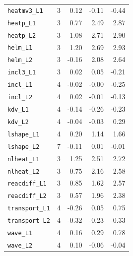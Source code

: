\begin{longtable}{lrrrr}
\texttt{heatmv3\_L1} & 3 & 0.12 & -0.11 & -0.44 \\
\texttt{heatp\_L1} & 3 & 0.77 & 2.49 & 2.87 \\
\texttt{heatp\_L2} & 3 & 1.08 & 2.71 & 2.90 \\
\texttt{helm\_L1} & 3 & 1.20 & 2.69 & 2.93 \\
\texttt{helm\_L2} & 3 & -0.16 & 2.08 & 2.64 \\
\texttt{incl3\_L1} & 3 & 0.02 & 0.05 & -0.21 \\
\texttt{incl\_L1} & 4 & -0.02 & -0.00 & -0.25 \\
\texttt{incl\_L2} & 4 & 0.02 & -0.01 & -0.13 \\
\texttt{kdv\_L1} & 4 & -0.14 & -0.26 & -0.23 \\
\texttt{kdv\_L2} & 4 & -0.04 & -0.03 & 0.29 \\
\texttt{lshape\_L1} & 4 & 0.20 & 1.14 & 1.66 \\
\texttt{lshape\_L2} & 7 & -0.11 & 0.01 & -0.01 \\
\texttt{nlheat\_L1} & 3 & 1.25 & 2.51 & 2.72 \\
\texttt{nlheat\_L2} & 3 & 0.75 & 2.16 & 2.58 \\
\texttt{reacdiff\_L1} & 3 & 0.85 & 1.62 & 2.57 \\
\texttt{reacdiff\_L2} & 3 & 0.57 & 1.96 & 2.38 \\
\texttt{transport\_L1} & 4 & -0.26 & 0.05 & 0.75 \\
\texttt{transport\_L2} & 4 & -0.32 & -0.23 & -0.33 \\
\texttt{wave\_L1} & 4 & 0.16 & 0.29 & 0.78 \\
\texttt{wave\_L2} & 4 & 0.10 & -0.06 & -0.04 \\
\bottomrule
\end{longtable}
